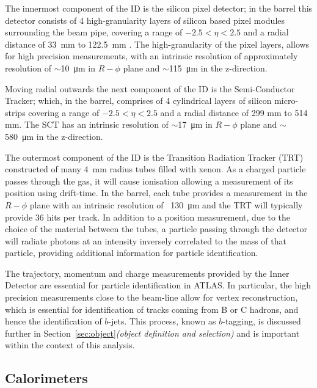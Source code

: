 The innermost component of the ID is the silicon pixel detector;
in the barrel this detector consists of 4 high-granularity layers of silicon based pixel modules surrounding the beam pipe,
covering a range of $-2.5 < \eta < 2.5$ and a radial distance of \SI{33}{mm} to \SI{122.5}{mm} \cite{det-IBL_TDR, det-IBL_Talk}.
The high-granularity of the pixel layers, allows for high precision measurements,
with an intrinsic resolution of approximately resolution of $\sim$\SI{10}{\micro\metre} in $R-\phi$ plane
and $\sim$\SI{115}{\micro\metre} in the z-direction. 

Moving radial outwards the next component of the ID is the Semi-Conductor Tracker;
which, in the barrel, comprises of 4 cylindrical layers of silicon micro-strips
covering a range of $-2.5 < \eta < 2.5$ and a radial distance of 299 mm to 514 mm.
The SCT has an intrinsic resolution of $\sim$\SI{17}{\micro\metre} in $R-\phi$ plane
and $\sim$\SI{580}{\micro\metre} in the z-direction. 

The outermost component of the ID is the Transition Radiation Tracker (TRT)
constructed of many \SI{4}{\mm} radius tubes filled with xenon.
As a charged particle passes through the gas,
it will cause ionisation allowing a measurement of its position using drift-time.
In the barrel, each tube provides a measurement in the $R-\phi$ plane
with an intrinsic resolution of ~\SI{130}{\micro\metre}
and the TRT will typically provide 36 hits per track.
In addition to a position measurement, due to the choice of the material between the tubes,
a particle passing through the detector will radiate photons
at an intensity inversely correlated to the mass of that particle,
providing additional information for particle identification. 

The trajectory, momentum and charge measurements provided by the Inner Detector are essential for particle identification in ATLAS.
In particular, the high precision measurements close to the beam-line allow for vertex reconstruction,
which is essential for identification of tracks coming from B or C hadrons, and hence the identification of $b$-jets.
This process, known as $b$-tagging, is discussed further in Section~\ref{sec:object}\textit{(object definition and selection)}
and is important within the context of this analysis. 

\subsection{Calorimeters}
\label{sec:det-calo}

